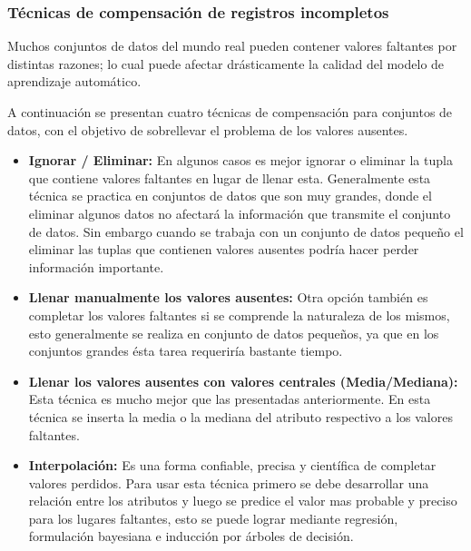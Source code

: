 \subsubsection{T\'{e}cnicas de compensaci\'{o}n de registros incompletos}

Muchos conjuntos de datos del mundo real pueden contener valores faltantes por distintas razones; lo cual puede afectar drásticamente la calidad del modelo de aprendizaje automático. 

A continuaci\'{o}n se presentan cuatro t\'{e}cnicas de compensaci\'{o}n para conjuntos de datos, con el objetivo de sobrellevar el problema de los valores ausentes.

\begin{itemize}
\item \textbf{Ignorar / Eliminar:} En algunos casos es mejor ignorar o eliminar la tupla que contiene valores faltantes en lugar de llenar esta. Generalmente esta t\'{e}cnica se practica en conjuntos de datos que son muy grandes, donde el eliminar algunos datos no afectar\'{a} la informaci\'{o}n que transmite el conjunto de datos. Sin embargo cuando se trabaja con un conjunto de datos peque\~{n}o el eliminar las tuplas que contienen valores ausentes podr\'{i}a hacer perder informaci\'{o}n importante.

\item \textbf{Llenar manualmente los valores ausentes:} Otra opci\'{o}n tambi\'{e}n es completar los valores faltantes si se comprende la naturaleza de los mismos, esto generalmente se realiza en conjunto de datos peque\~{n}os, ya que en los conjuntos grandes \'{e}sta tarea requerir\'{i}a bastante tiempo.

\item \textbf{Llenar los valores ausentes con valores centrales (Media/Mediana):} Esta t\'{e}cnica es mucho mejor que las presentadas anteriormente. En esta t\'{e}cnica se inserta la media o la mediana del atributo respectivo a los valores faltantes. 

\item \textbf{Interpolaci\'{o}n:} Es una forma confiable, precisa y cient\'{i}fica de completar valores perdidos. Para usar esta t\'{e}cnica primero se debe desarrollar una relaci\'{o}n entre los atributos y luego se predice el valor mas probable y preciso para los lugares faltantes, esto se puede lograr mediante regresi\'{o}n, formulaci\'{o}n bayesiana e inducci\'{o}n por \'{a}rboles de decisi\'{o}n.

\end{itemize}

